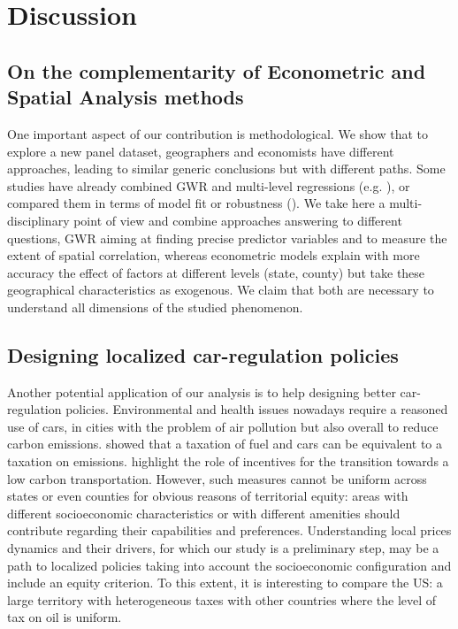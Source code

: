 \documentclass[10pt]{article}
\begin{document}
\section{Discussion} \label{sec:discuss}

\subsection*{On the complementarity of Econometric and Spatial Analysis methods}

One important aspect of our contribution is methodological. We show that to explore a new panel dataset, geographers and economists have different approaches, leading to similar generic conclusions but with different paths. Some studies have already combined GWR and multi-level regressions (e.g. \citealp{chen2012using}), or compared them in terms of model fit or robustness (\citealp{lee2009determinants}). We take here a multi-disciplinary point of view and combine approaches answering to different questions, GWR aiming at finding precise predictor variables and to measure the extent of spatial correlation, whereas econometric models explain with more accuracy the effect of factors at different levels (state, county) but take these geographical characteristics as exogenous. We claim that both are necessary to understand all dimensions of the studied phenomenon.

\subsection*{Designing localized car-regulation policies}

Another potential application of our analysis is to help designing better car-regulation policies. Environmental and health issues nowadays require a reasoned use of cars, in cities with the problem of air pollution but also overall to reduce carbon emissions. \cite{fullerton2002can} showed that a taxation of fuel and cars can be equivalent to a taxation on emissions. \cite{brand2013accelerating} highlight the role of incentives for the transition towards a low carbon transportation. However, such measures cannot be uniform across states or even counties for obvious reasons of territorial equity: areas with different socioeconomic characteristics or with different amenities should contribute regarding their capabilities and preferences. Understanding local prices dynamics and their drivers, for which our study is a preliminary step, may be a path to localized policies taking into account the socioeconomic configuration and include an equity criterion. To this extent, it is interesting to compare the US: a large territory with heterogeneous taxes with other countries where the level of tax on oil is uniform.
\end{document}
